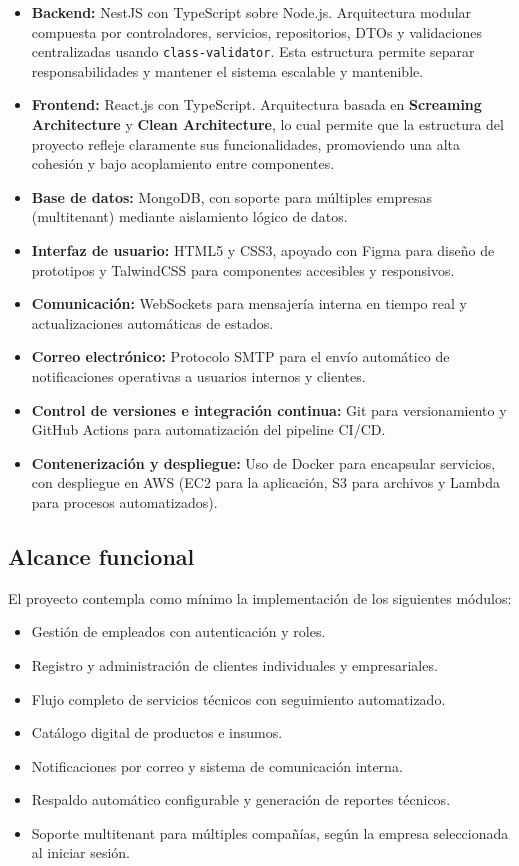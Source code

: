 \begin{itemize}
	\item \textbf{Backend:} NestJS con TypeScript sobre Node.js. Arquitectura modular compuesta por controladores, servicios, repositorios, DTOs y validaciones centralizadas usando \texttt{class-validator}. Esta estructura permite separar responsabilidades y mantener el sistema escalable y mantenible.
	\item \textbf{Frontend:} React.js con TypeScript. Arquitectura basada en \textbf{Screaming Architecture} y \textbf{Clean Architecture}, lo cual permite que la estructura del proyecto refleje claramente sus funcionalidades, promoviendo una alta cohesión y bajo acoplamiento entre componentes.
	\item \textbf{Base de datos:} MongoDB, con soporte para múltiples empresas (multitenant) mediante aislamiento lógico de datos.
	\item \textbf{Interfaz de usuario:} HTML5 y CSS3, apoyado con Figma para diseño de prototipos y TalwindCSS para componentes accesibles y responsivos.
	\item \textbf{Comunicación:} WebSockets para mensajería interna en tiempo real y actualizaciones automáticas de estados.
	\item \textbf{Correo electrónico:} Protocolo SMTP para el envío automático de notificaciones operativas a usuarios internos y clientes.
	\item \textbf{Control de versiones e integración continua:} Git para versionamiento y GitHub Actions para automatización del pipeline CI/CD.
	\item \textbf{Contenerización y despliegue:} Uso de Docker para encapsular servicios, con despliegue en AWS (EC2 para la aplicación, S3 para archivos y Lambda para procesos automatizados).
\end{itemize}


\subsection*{Alcance funcional}

El proyecto contempla como mínimo la implementación de los siguientes módulos:

\begin{itemize}
	\item Gestión de empleados con autenticación y roles.
	\item Registro y administración de clientes individuales y empresariales.
	\item Flujo completo de servicios técnicos con seguimiento automatizado.
	\item Catálogo digital de productos e insumos.
	\item Notificaciones por correo y sistema de comunicación interna.
	\item Respaldo automático configurable y generación de reportes técnicos.
	\item Soporte multitenant para múltiples compañías, según la empresa seleccionada al iniciar sesión.
\end{itemize}

